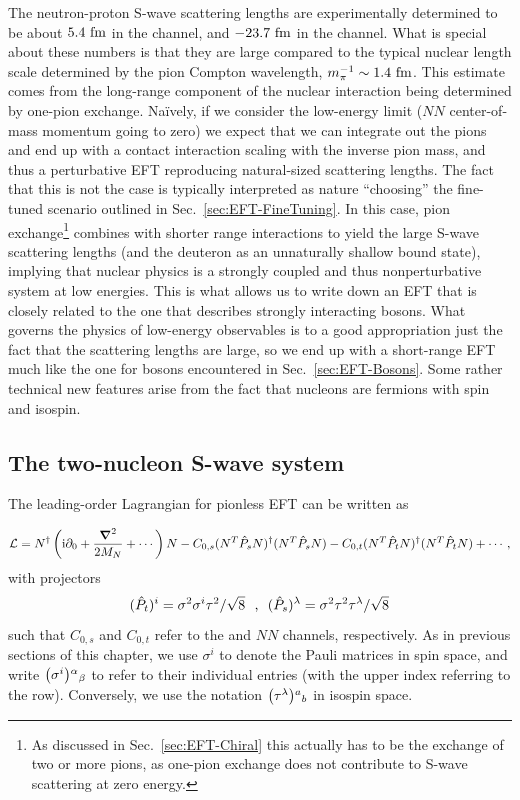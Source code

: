 The neutron-proton S-wave scattering lengths are experimentally determined to 
be about $5.4~\mathrm{fm}$ in the \ThreeSOne channel, and ${-}23.7~\mathrm{fm}$ in the \OneSNot 
channel.  What is special about these numbers is that they are large compared 
to the typical nuclear length scale determined by the pion Compton wavelength, 
$m_\pi^{-1}\sim1.4~\mathrm{fm}$.  This estimate comes from the long-range component of 
the nuclear interaction being determined by one-pion exchange.  Na\"ively, if 
we consider the low-energy limit ($NN$ center-of-mass momentum going to zero) 
we expect that we can integrate out the pions and end up with a contact 
interaction scaling with the inverse pion mass, and thus a perturbative EFT 
reproducing natural-sized scattering lengths.  The fact that this is not the 
case is typically interpreted as nature ``choosing'' the fine-tuned scenario 
outlined in Sec.~\ref{sec:EFT-FineTuning}.  In this case, pion 
exchange\footnote{As discussed in Sec.~\ref{sec:EFT-Chiral} this actually has to 
be the exchange of two or more pions, as one-pion exchange does not contribute 
to S-wave scattering at zero energy.} combines with shorter range interactions 
to yield the large S-wave scattering lengths (and the deuteron as an 
unnaturally shallow bound state), implying that nuclear physics is a strongly 
coupled and thus nonperturbative system at low energies.  This is what allows 
us to write down an EFT that is closely related to the one that describes 
strongly interacting bosons.  What governs the physics of low-energy 
observables is to a good appropriation just the fact that the scattering 
lengths are large, so we end up with a short-range EFT much like the one for 
bosons encountered in Sec.~\ref{sec:EFT-Bosons}.  Some rather technical new 
features arise from the fact that nucleons are fermions with spin and isospin.

\subsection{The two-nucleon S-wave system}

The leading-order Lagrangian for pionless EFT can be written as

\begin{equation}
 \LL
 = N^\dagger \left(\ii\partial_0 + \frac{\Laplace}{2\MN} + \cdots\right)N \\
 - C_{0,s} (N^T \hat{P}_s N)^\dagger(N^T \hat{P}_s N) \\
 - C_{0,t} (N^T \hat{P}_t N)^\dagger(N^T \hat{P}_t N)
 + \cdots \,,
\label{eq:L-NN}
\end{equation}
%
with projectors
%
\begin{equation}
 (\hat{P}_t)^i = \sigma^2\sigma^i\tau^2 / \sqrt8 \mathtext{,}
 (\hat{P}_s)^\lambda = \sigma^2\tau^2\tau^\lambda/\sqrt8
\label{eq:P-t-s}
\end{equation}
%
such that $C_{0,s}$ and $C_{0,t}$ refer to the \OneSNot and \ThreeSOne $NN$ 
channels, respectively.  As in previous sections of this chapter, we use 
$\sigma^i$ to denote the Pauli matrices in spin space, and write 
$\big(\sigma^i\big){}^{\alpha}{}_{\beta}$ to refer to their individual entries (with the
upper index referring to the row).  Conversely, we use the notation 
$\big(\tau^\lambda\big){}^{a}{}_{b}$ in isospin space.

